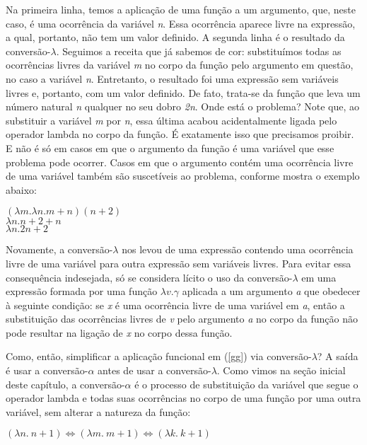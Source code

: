 \n Na primeira linha, temos a aplicação de uma função a um
argumento, que, neste caso, é uma ocorrência da variável
\textit{n}. Essa ocorrência aparece livre na expressão, a
qual, portanto, não tem um valor definido. A segunda linha é o
resultado da conversão-$\lambda$. Seguimos a receita que já
sabemos de cor: substituímos todas as ocorrências livres
da variável \textit{m} no corpo da função pelo argumento em
questão, no caso a variável \textit{n}. Entretanto, o resultado
foi uma expressão sem variáveis livres e, portanto, com um valor
definido. De fato, trata-se da função que leva um número natural
\textit{n} qualquer no seu dobro \textit{2n}. Onde está o
problema? Note que, ao substituir a variável \textit{m} por
\textit{n}, essa última acabou acidentalmente ligada pelo operador
lambda no corpo da função. É exatamente isso que precisamos
proibir. E não é só em casos em que o argumento da função é uma
variável que esse problema pode ocorrer. Casos em que o argumento
contém uma ocorrência livre de uma variável também são
suscetíveis ao problema, conforme mostra o exemplo abaixo:

\begin{exe}
	\ex $(\lambda m. \lambda n. m+n)(n+2)$\\
	$\lambda n. n+2+n$\\
	$\lambda n. 2n+2$\label{sl}
\end{exe}

\n Novamente, a conversão-$\lambda$ nos levou de uma expressão
contendo uma ocorrência livre de uma variável para outra
expressão sem variáveis livres. Para evitar essa consequência
indesejada, só se considera lícito o uso da conversão-$\lambda$ em
uma expressão formada por uma função $\lambda v. \gamma$
aplicada a um argumento \textit{a} que obedecer à seguinte
condição: se \textit{x} é uma ocorrência livre de uma
variável em \textit{a}, então a substituição das
ocorrências livres de \textit{v} pelo argumento \textit{a}
no corpo da função não pode resultar na ligação de \textit{x}
no corpo dessa função.

Como, então, simplificar a aplicação funcional em (\ref{gg})
via conversão-$\lambda$? A saída é usar a conversão-$\alpha$ antes
de usar a conversão-$\lambda$. Como vimos na seção inicial deste capítulo, a conversão-$\alpha$ é o processo de substituição da variável que segue o operador lambda e todas suas ocorrências no corpo de uma função por uma outra variável, sem alterar a natureza da função:

\begin{exe}
	\ex $(\lambda n.\ n + 1) \Leftrightarrow (\lambda m.\ m + 1) \Leftrightarrow (\lambda k.\ k + 1)$
\end{exe}

